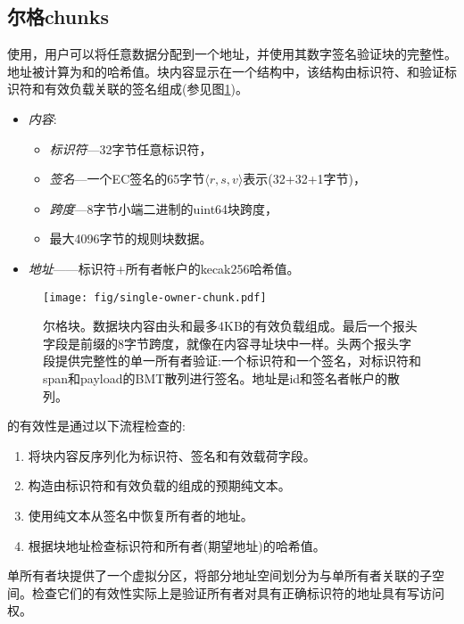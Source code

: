 \subsection{尔格chunks\statusgreen}\label{sec:single-owner-chunks}

使用，用户可以将任意数据分配到一个地址，并使用其数字签名验证块的完整性。地址被计算为和的哈希值。块内容显示在一个结构中，该结构由标识符、和验证标识符和有效负载关联的签名组成(参见图\ref{fig:single-owner-chunks})。

\begin{itemize}
    \item \emph{内容}:
\begin{itemize}
    \item \emph{标识符}—32字节任意标识符， 
    \item \emph{签名}—一个EC签名的65字节$\langle r,s,v \rangle$表示(32+32+1字节)，
    \item \emph{跨度}—8字节小端二进制的uint64块跨度，
    \item 最大4096字节的规则块数据。
\end{itemize}
    \item \emph{地址}——标识符+所有者帐户的kecak256哈希值。
\end{itemize}

\begin{figure}[htbp]
   \centering
   \texttt{[image: fig/single-owner-chunk.pdf]}
   \caption[尔格chunk\statusgreen]{尔格块。数据块内容由头和最多4KB的有效负载组成。最后一个报头字段是前缀的8字节跨度，就像在内容寻址块中一样。头两个报头字段提供完整性的单一所有者验证:一个标识符和一个签名，对标识符和span和payload的BMT散列进行签名。地址是id和签名者帐户的散列。}
   \label{fig:single-owner-chunks}
\end{figure}

的有效性是通过以下流程检查的:

\begin{enumerate}
    \item 将块内容反序列化为标识符、签名和有效载荷字段。
    \item 构造由标识符和有效负载的组成的预期纯文本。
    \item 使用纯文本从签名中恢复所有者的地址。
    \item 根据块地址检查标识符和所有者(期望地址)的哈希值。
\end{enumerate}

单所有者块提供了一个虚拟分区，将部分地址空间划分为与单所有者关联的子空间。检查它们的有效性实际上是验证所有者对具有正确标识符的地址具有写访问权。

